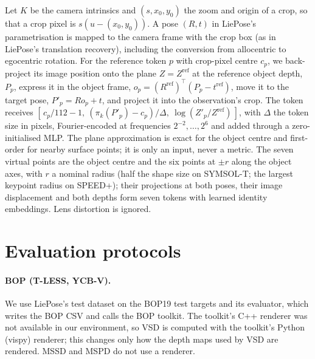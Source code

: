 Let $K$ be the camera intrinsics and $(s,x_0,y_0)$ the zoom and origin of a crop, so that a crop pixel is $s(u-(x_0,y_0))$. A pose
$(R,t)$ in LiePose's parametrisation is mapped to the camera frame with the crop box (as in LiePose's translation recovery), including
the conversion from allocentric to egocentric rotation. For the reference token $p$ with crop-pixel centre $c_p$, we back-project its
image position onto the plane $Z=Z^{\mathrm{ref}}$ at the reference object depth, $P_p$, express it in the object frame,
$o_p=(R^{\mathrm{ref}})^\top(P_p-t^{\mathrm{ref}})$, move it to the target pose, $P'_p=Ro_p+t$, and project it into the observation's crop. The
token receives $[\,c_p/112-1,\ (\pi_k(P'_p)-c_p)/\Delta,\ \log(Z'_p/Z^{\mathrm{ref}})\,]$, with $\Delta$ the token size in pixels, Fourier-encoded at
frequencies $2^{-2},\dots,2^{6}$ and added through a zero-initialised MLP. The plane approximation is exact for the object centre and
first-order for nearby surface points; it is only an input, never a metric. The seven virtual points are the object centre and the
six points at $\pm r$ along the object axes, with $r$ a nominal radius (half the shape size on SYMSOL-T; the largest keypoint radius on
SPEED+); their projections at both poses, their image displacement and both depths form seven tokens with learned identity embeddings.
Lens distortion is ignored.

\section{Evaluation protocols}
\label{sec:supp-protocol}

\paragraph{BOP (T-LESS, YCB-V).}
We use LiePose's test dataset on the BOP19 test targets and its evaluator, which writes the BOP CSV and calls the BOP toolkit. The
toolkit's C++ renderer was not available in our environment, so VSD is computed with the toolkit's Python (vispy) renderer; this
changes only how the depth maps used by VSD are rendered. MSSD and MSPD do not use a renderer. 

